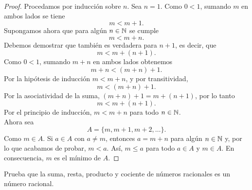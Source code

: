 \documentclass[12pt,a4paper]{article}
\begin{document}
    \begin{proof}
        Procedamos por inducción sobre $n$. Sea $n=1$. Como $0\lt1$, sumando $m$ en ambos lados se tiene
        \begin{equation*}
            m\lt m+1.
        \end{equation*}
        Supongamos ahora que para algún $n\in\mathbb{N}$ se cumple
        \begin{equation*}
            m\lt m+n.
        \end{equation*}
        Debemos demostrar que también es verdadera para $n+1$, es decir, que
        \begin{equation*}
            m\lt m+(n+1).
        \end{equation*}
        Como $0\lt1$, sumando $m+n$ en ambos lados obtenemos
        \begin{equation*}
            m+n\lt(m+n)+1.
        \end{equation*}
        Por la hipótesis de inducción $m\lt m+n$, y por transitividad,
        \begin{equation*}
            m\lt(m+n)+1.
        \end{equation*}
        Por la asociatividad de la suma, $(m+n)+1=m+(n+1)$, por lo tanto
        \begin{equation*}
            m\lt m+(n+1).
        \end{equation*}
        Por el principio de inducción, $m\lt m+n$ para todo $n\in\mathbb{N}$.\\
        Ahora sea
        \begin{equation*}
            A=\{m,m+1,m+2,\dots\}.
        \end{equation*}
        Como $m\in A$. Si $a\in A$ con $a\neq m$, entonces $a=m+n$ para algún $n\in\mathbb{N}$ y, por lo que acabamos de probar, $m\lt a$. Así, $m\leq a$ para todo $a\in A$ y $m\in A$. En consecuencia, $m$ es el mínimo de $A$.
    \end{proof}

    \begin{problema}
        Prueba que la suma, resta, producto y cociente de números racionales es un número racional.
    \end{problema}
\end{document}
